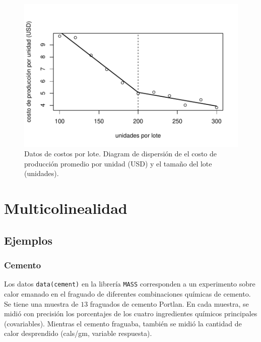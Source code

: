 \documentclass[
]{article}
\begin{document}
\begin{figure}

{\centering \includegraphics{MLG2_files/figure-latex/LotesFigure2-1} 

}

\caption{Datos de costos por lote. Diagram de dispersión de el costo de producción promedio por unidad (USD) y el tamaño del lote (unidades).}\label{fig:LotesFigure2}
\end{figure}

\hypertarget{multicolinealidad}{%
\section{Multicolinealidad}\label{multicolinealidad}}

\hypertarget{ejemplos-2}{%
\subsection{Ejemplos}\label{ejemplos-2}}

\hypertarget{cemento}{%
\subsubsection{Cemento}\label{cemento}}

Los datos \texttt{data(cement)} en la librería \texttt{MASS} corresponden a un experimento sobre calor emanado en el fraguado de diferentes combinaciones químicas de cemento. Se tiene una muestra de \(13\) fraguados de cemento Portlan. En cada muestra, se midió con precisión los porcentajes de los cuatro ingredientes químicos principales (covariables). Mientras el cemento fraguaba, también se midió la cantidad de calor desprendido (cals/gm, variable respuesta).
\end{document}
